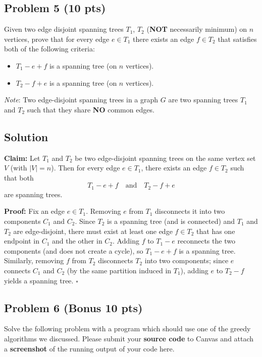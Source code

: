 \documentclass[12pt]{article}
\begin{document}
\bigskip

\subsection*{Problem 5 (10 pts)}
Given two edge disjoint spanning trees $T_1$, $T_2$ (\textbf{NOT} necessarily minimum) on $n$ vertices, prove that for every 
edge $e \in T_1$ there exists an edge $f \in T_2$ that satisfies both of the following criteria:
\begin{itemize}
    \item $T_1 - e + f$ is a spanning tree (on $n$ vertices).
    \item $T_2 - f + e$ is a spanning tree (on $n$ vertices).
\end{itemize}
\textit{Note}: Two edge-disjoint spanning trees in a graph $G$ are two spanning trees $T_1$ and $T_2$ such that they share \textbf{NO} common edges. 

\subsection*{Solution}
\textbf{Claim:} Let \(T_1\) and \(T_2\) be two edge-disjoint spanning trees on the same vertex set \(V\) (with \(|V|=n\)). Then for every edge \(e\in T_1\), there exists an edge \(f\in T_2\) such that both
\[
T_1 - e + f \quad \text{and} \quad T_2 - f + e
\]
are spanning trees.

\textbf{Proof:}  
Fix an edge \(e\in T_1\). Removing \(e\) from \(T_1\) disconnects it into two components \(C_1\) and \(C_2\). Since \(T_2\) is a spanning tree (and is connected) and \(T_1\) and \(T_2\) are edge-disjoint, there must exist at least one edge \(f\in T_2\) that has one endpoint in \(C_1\) and the other in \(C_2\). Adding \(f\) to \(T_1-e\) reconnects the two components (and does not create a cycle), so \(T_1-e+f\) is a spanning tree. Similarly, removing \(f\) from \(T_2\) disconnects \(T_2\) into two components; since \(e\) connects \(C_1\) and \(C_2\) (by the same partition induced in \(T_1\)), adding \(e\) to \(T_2-f\) yields a spanning tree. \(\square\)

\bigskip

\subsection*{Problem 6 (Bonus 10 pts)}
Solve the following problem with a program which should use one of the greedy algorithms we discussed. Please submit your \textbf{source code} to Canvas and attach a \textbf{screenshot} of the running output of your code here.\\
\end{document}

